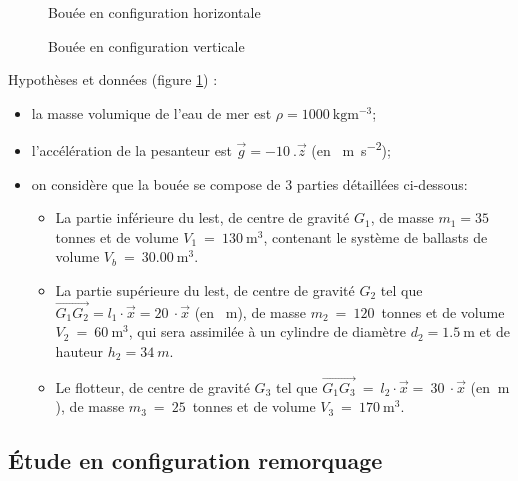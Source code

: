\begin{figure}[ht!]
\begin{center}
  \def\svgwidth{0.8\linewidth}
  
 \end{center}
  \caption{Bouée en configuration horizontale}
\label{fig05}
\end{figure}

\begin{figure}
	\vspace{-0.8cm}
\begin{center}
  \def\svgwidth{0.7\linewidth}
  
 \end{center}
  \caption{Bouée en configuration verticale}
\label{fig06}
\end{figure}

Hypothèses et données (figure \ref{fig05}) :
\begin{itemize}
 \item la masse volumique de l'eau de mer est $\rho=\SI{1000}{\kg \m^{-3}}$;
 \item l'accélération de la pesanteur est $\vec{g} = \SI{-10}{}.\vec{z}$ (en \SI{}{\m \s^{-2}});
 \item on considère que la bouée se compose de 3
parties détaillées ci-dessous:
\begin{itemize}
\item La partie inférieure du lest, de centre de
gravité $G_1$, de masse $m_1=\num{35}$ tonnes et de volume $V_1~=~\SI{130}{\m^3}$, contenant le système de ballasts de volume $V_b~=~\SI{30,00}{\m^3}$.
\item La partie supérieure du lest, de centre de gravité $G_2$ tel que $\overrightarrow{G_1G_2}= l_1\cdot \vec{x}= \SI{20}{}\cdot \vec{x}$ (en \SI{}{\m}), de masse $m_2~=~\num{120}$~tonnes et de volume $V_2~=~\SI{60}{\m^3}$, qui sera assimilée à un cylindre de diamètre $d_2=\SI{1,5}{\m}$ et de hauteur $h_2=\SI{34}{m}$.
\item Le flotteur, de centre de gravité $G_3$ tel que $\overrightarrow{G_1G_3}~=~l_2\cdot \vec{x}=~\SI{30}{}\cdot\vec{x}$ (en $\SI{}{\m}$), de masse $m_3~=~\num{25}$~tonnes et de volume $V_3~=~\SI{170}{\m^3}$.
\end{itemize}
\end{itemize}

\subsection{Étude en configuration remorquage}

